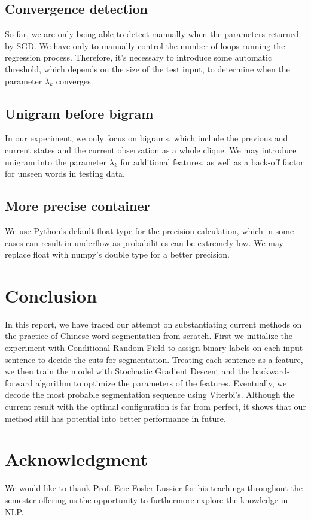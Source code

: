\documentclass[UTF8,11pt]{article}
\begin{document}
\subsection{Convergence detection}
\noindent So far, we are only being able to detect manually when the parameters returned by SGD. We have only to manually control the number of loops running the regression process. Therefore, it's necessary to introduce some automatic threshold, which depends on the size of the test input, to determine when the parameter $\lambda_k$ converges.

\subsection{Unigram before bigram}
\noindent In our experiment, we only focus on bigrams, which include the previous and current states and the current observation as a whole clique. We may introduce unigram into the parameter $\lambda_k$ for additional features, as well as a back-off factor for unseen words in testing data.

\subsection{More precise container}
\noindent We use Python's default float type for the precision calculation, which in some cases can result in underflow as probabilities can be extremely low. We may replace float with numpy's double type for a better precision.

\section{Conclusion}
\noindent In this report, we have traced our attempt on substantiating current methods on the practice of Chinese word segmentation from scratch. First we initialize the experiment with Conditional Random Field to assign binary labels on each input sentence to decide the cuts for segmentation. Treating each sentence as a feature, we then train the model with Stochastic Gradient Descent and the backward-forward algorithm to optimize the parameters of the features. Eventually, we decode the most probable segmentation sequence using Viterbi's. Although the current result with the optimal configuration is far from perfect, it shows that our method still has potential into better performance in future. 

\section{Acknowledgment}
\noindent We would like to thank Prof. Eric Fosler-Lussier for his teachings throughout the semester offering us the opportunity to furthermore explore the knowledge in NLP.
\end{document}
